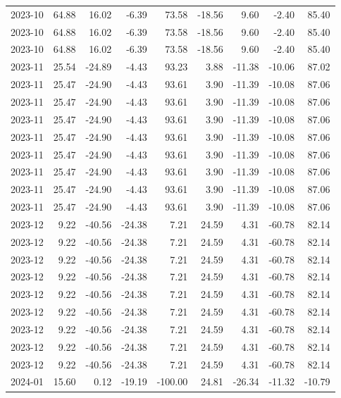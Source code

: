 \begin{table}[ht]
\begin{tabular}{lrrrrrrrr}
  2023-10 & 64.88 & 16.02 & -6.39 & 73.58 & -18.56 & 9.60 & -2.40 & 85.40 \\ 
  2023-10 & 64.88 & 16.02 & -6.39 & 73.58 & -18.56 & 9.60 & -2.40 & 85.40 \\ 
  2023-10 & 64.88 & 16.02 & -6.39 & 73.58 & -18.56 & 9.60 & -2.40 & 85.40 \\ 
  2023-11 & 25.54 & -24.89 & -4.43 & 93.23 & 3.88 & -11.38 & -10.06 & 87.02 \\ 
  2023-11 & 25.47 & -24.90 & -4.43 & 93.61 & 3.90 & -11.39 & -10.08 & 87.06 \\ 
  2023-11 & 25.47 & -24.90 & -4.43 & 93.61 & 3.90 & -11.39 & -10.08 & 87.06 \\ 
  2023-11 & 25.47 & -24.90 & -4.43 & 93.61 & 3.90 & -11.39 & -10.08 & 87.06 \\ 
  2023-11 & 25.47 & -24.90 & -4.43 & 93.61 & 3.90 & -11.39 & -10.08 & 87.06 \\ 
  2023-11 & 25.47 & -24.90 & -4.43 & 93.61 & 3.90 & -11.39 & -10.08 & 87.06 \\ 
  2023-11 & 25.47 & -24.90 & -4.43 & 93.61 & 3.90 & -11.39 & -10.08 & 87.06 \\ 
  2023-11 & 25.47 & -24.90 & -4.43 & 93.61 & 3.90 & -11.39 & -10.08 & 87.06 \\ 
  2023-11 & 25.47 & -24.90 & -4.43 & 93.61 & 3.90 & -11.39 & -10.08 & 87.06 \\ 
  2023-12 & 9.22 & -40.56 & -24.38 & 7.21 & 24.59 & 4.31 & -60.78 & 82.14 \\ 
  2023-12 & 9.22 & -40.56 & -24.38 & 7.21 & 24.59 & 4.31 & -60.78 & 82.14 \\ 
  2023-12 & 9.22 & -40.56 & -24.38 & 7.21 & 24.59 & 4.31 & -60.78 & 82.14 \\ 
  2023-12 & 9.22 & -40.56 & -24.38 & 7.21 & 24.59 & 4.31 & -60.78 & 82.14 \\ 
  2023-12 & 9.22 & -40.56 & -24.38 & 7.21 & 24.59 & 4.31 & -60.78 & 82.14 \\ 
  2023-12 & 9.22 & -40.56 & -24.38 & 7.21 & 24.59 & 4.31 & -60.78 & 82.14 \\ 
  2023-12 & 9.22 & -40.56 & -24.38 & 7.21 & 24.59 & 4.31 & -60.78 & 82.14 \\ 
  2023-12 & 9.22 & -40.56 & -24.38 & 7.21 & 24.59 & 4.31 & -60.78 & 82.14 \\ 
  2023-12 & 9.22 & -40.56 & -24.38 & 7.21 & 24.59 & 4.31 & -60.78 & 82.14 \\ 
  2024-01 & 15.60 & 0.12 & -19.19 & -100.00 & 24.81 & -26.34 & -11.32 & -10.79 \\ 

\end{tabular}
\end{table}
